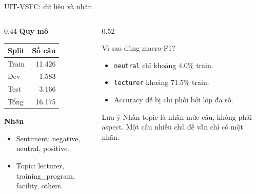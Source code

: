 \documentclass[aspectratio=169,11pt]{beamer}
\begin{document}
\begin{frame}{UIT-VSFC: dữ liệu và nhãn}
\begin{columns}[T]
\begin{column}{0.44\textwidth}
\textbf{Quy mô}
\vspace{0.15cm}
\begin{tabular}{@{}lr@{}}
\toprule
Split & Số câu \\
\midrule
Train & 11.426 \\
Dev & 1.583 \\
Test & 3.166 \\
\midrule
Tổng & 16.175 \\
\bottomrule
\end{tabular}

\vspace{0.45cm}
\textbf{Nhãn}
\begin{itemize}
  \item Sentiment: negative, neutral, positive.
  \item Topic: lecturer, training\_program, facility, others.
\end{itemize}
\end{column}
\begin{column}{0.52\textwidth}
\begin{block}{Vì sao dùng macro-F1?}
\begin{itemize}
  \item \texttt{neutral} chỉ khoảng 4.0\% train.
  \item \texttt{lecturer} khoảng 71.5\% train.
  \item Accuracy dễ bị chi phối bởi lớp đa số.
\end{itemize}
\end{block}

\begin{alertblock}{Lưu ý}
Nhãn topic là nhãn mức câu, không phải aspect. Một câu nhiều chủ đề vẫn chỉ có một nhãn.
\end{alertblock}
\end{column}
\end{columns}
\end{frame}
\end{document}
